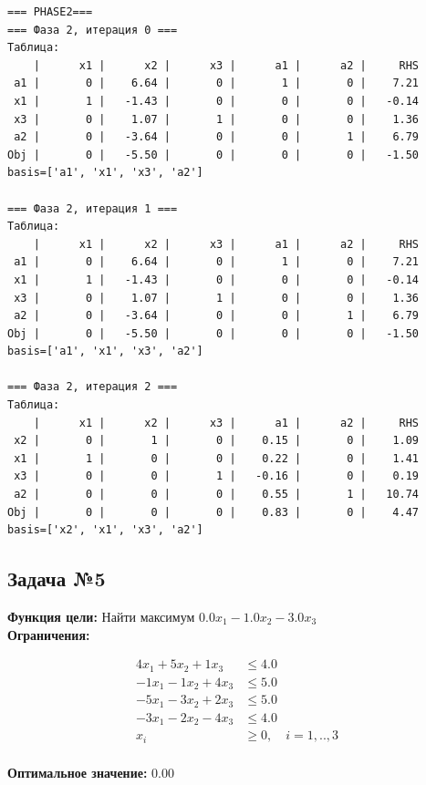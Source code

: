 \documentclass[a4paper,12pt]{article}
\begin{document}
\begin{verbatim}
=== PHASE2===
=== Фаза 2, итерация 0 ===
Таблица:
    |      x1 |      x2 |      x3 |      a1 |      a2 |     RHS
 a1 |       0 |    6.64 |       0 |       1 |       0 |    7.21
 x1 |       1 |   -1.43 |       0 |       0 |       0 |   -0.14
 x3 |       0 |    1.07 |       1 |       0 |       0 |    1.36
 a2 |       0 |   -3.64 |       0 |       0 |       1 |    6.79
Obj |       0 |   -5.50 |       0 |       0 |       0 |   -1.50
basis=['a1', 'x1', 'x3', 'a2']

=== Фаза 2, итерация 1 ===
Таблица:
    |      x1 |      x2 |      x3 |      a1 |      a2 |     RHS
 a1 |       0 |    6.64 |       0 |       1 |       0 |    7.21
 x1 |       1 |   -1.43 |       0 |       0 |       0 |   -0.14
 x3 |       0 |    1.07 |       1 |       0 |       0 |    1.36
 a2 |       0 |   -3.64 |       0 |       0 |       1 |    6.79
Obj |       0 |   -5.50 |       0 |       0 |       0 |   -1.50
basis=['a1', 'x1', 'x3', 'a2']

=== Фаза 2, итерация 2 ===
Таблица:
    |      x1 |      x2 |      x3 |      a1 |      a2 |     RHS
 x2 |       0 |       1 |       0 |    0.15 |       0 |    1.09
 x1 |       1 |       0 |       0 |    0.22 |       0 |    1.41
 x3 |       0 |       0 |       1 |   -0.16 |       0 |    0.19
 a2 |       0 |       0 |       0 |    0.55 |       1 |   10.74
Obj |       0 |       0 |       0 |    0.83 |       0 |    4.47
basis=['x2', 'x1', 'x3', 'a2']

\end{verbatim}



\subsection*{Задача №5}
\textbf{Функция цели: }
Найти максимум $ 0.0x_{1} -1.0x_{2} -3.0x_{3} $\\

\textbf{Ограничения:}

\[ \begin{aligned}
4x_{1} +5x_{2} +1x_{3} &\le 4.0 \\
-1x_{1} -1x_{2} +4x_{3} &\le 5.0 \\
-5x_{1} -3x_{2} +2x_{3} &\le 5.0 \\
-3x_{1} -2x_{2} -4x_{3} &\le 4.0 \\
x_i &\ge 0,\quad i=1,..,3\\
\end{aligned}\]

\textbf{Оптимальное значение: }$0.00$
\end{document}
